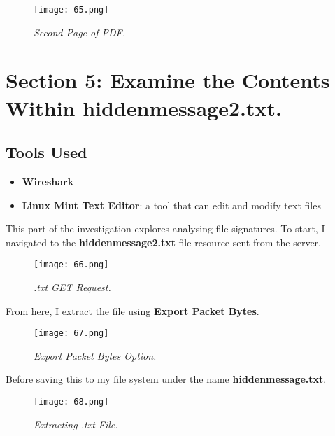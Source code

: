 \begin{figure}[H]
    \setlength{\abovecaptionskip}{20pt}
    \setlength{\belowcaptionskip}{0pt}
    \centering
    \texttt{[image: 65.png]}
    \captionsetup{justification=centering}
    \caption{\textit{Second Page of PDF.}}
    \label{fig:65}
\end{figure}
\vspace{-10pt}

\section{Section 5: Examine the Contents Within \textbf{hiddenmessage2.txt}.}
\subsection{Tools Used}
\begin{itemize}
    \item \textbf{Wireshark}
    \item \textbf{Linux Mint Text Editor}: a tool that can edit and modify text files
\end{itemize}

This part of the investigation explores analysing file signatures. To start, I navigated to the \textbf{hiddenmessage2.txt} file resource sent from the server.

\begin{figure}[H]
    \setlength{\abovecaptionskip}{20pt}
    \setlength{\belowcaptionskip}{0pt}
    \centering
    \texttt{[image: 66.png]}
    \captionsetup{justification=centering}
    \caption{\textit{.txt GET Request.}}
    \label{fig:66}
\end{figure}
\vspace{-10pt}

From here, I extract the file using \textbf{Export Packet Bytes}. 

\begin{figure}[H]
    \setlength{\abovecaptionskip}{20pt}
    \setlength{\belowcaptionskip}{0pt}
    \centering
    \texttt{[image: 67.png]}
    \captionsetup{justification=centering}
    \caption{\textit{Export Packet Bytes Option.}}
    \label{fig:67}
\end{figure}
\vspace{-10pt}

Before saving this to my file system under the name \textbf{hiddenmessage.txt}.

\begin{figure}[H]
    \setlength{\abovecaptionskip}{20pt}
    \setlength{\belowcaptionskip}{0pt}
    \centering
    \texttt{[image: 68.png]}
    \captionsetup{justification=centering}
    \caption{\textit{Extracting .txt File.}}
    \label{fig:68}
\end{figure}
\vspace{-10pt}

